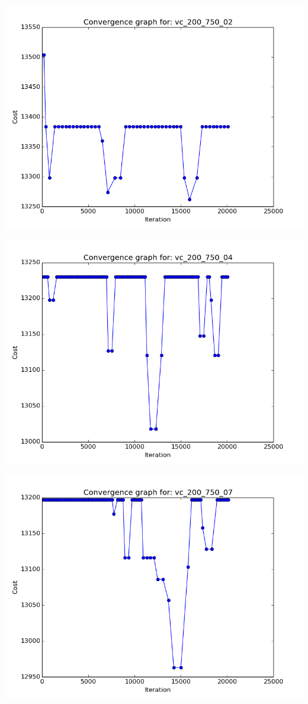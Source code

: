 \documentclass[11pt]{article}
\begin{document}
\begin{center}
\begin{minipage}{0.48\linewidth}
\includegraphics[width=\linewidth]{cg_1.png}
\end{minipage}%
\begin{minipage}{0.49\linewidth}
\includegraphics[width=\linewidth]{cg_2.png}
\end{minipage}
\begin{minipage}{0.49\linewidth}
\includegraphics[width=\linewidth]{cg_3.png}

\end{minipage}
\end{center}
\end{document}
